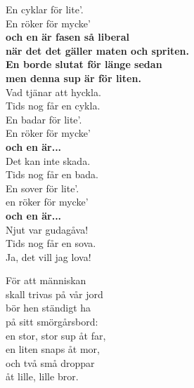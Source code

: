 \documentclass[a6paper, 10pt, twoside]{article}
\begin{document}
\newpage
\noindent
\begin{center}
\end{center}
\vspace{-5pt}
\begin{lyrics}
En cyklar för lite'. \\
En röker för mycke' \\
\textbf{och en är fasen så liberal  \\
när det det gäller maten och spriten. \\
En borde slutat för länge sedan\\
men denna sup är för liten.} \\
Vad tjänar att hyckla. \\
Tids nog får en cykla.
\vspace{5pt}\\
En badar för lite'. \\
En röker för mycke' \\
\textbf{och en är...}\\
Det kan inte skada. \\
Tids nog får en bada.
\vspace{5pt}\\
 En sover för lite'. \\
en röker för mycke' \\
\textbf{och en är...}\\
Njut var gudagåva! \\
Tids nog får en sova.\\
Ja, det vill jag lova! 
\end{lyrics}
\vspace{-10pt}
\begin{center}
\end{center}
\vspace{-5pt}
\begin{lyrics}
För att människan \\
skall trivas på vår jord \\
bör hen ständigt ha \\
på sitt smörgårsbord: 
\vspace{5pt}\\
en stor, stor sup åt far, \\
en liten snaps åt mor, \\
och två små droppar \\
åt lille, lille bror. 
\end{lyrics}
\end{document}
